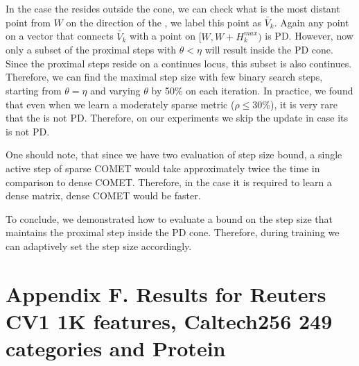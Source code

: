 \documentclass[twoside,11pt]{article}
\newcommand\mat[1]{{#1}}
\newcommand{\W}{\mat{W}}
\newcommand{\Hk}{H_k}
\newcommand{\Vk}{\mat{V_k}}
\begin{document}
In the case the \Vkorigin resides outside the cone, we can check what is the most distant point from $\W$ on the direction of the \Vkorigin, we label this point as $\widetilde{\Vk}$. Again any point on a vector that connects $\widetilde{\Vk}$ with a point on $[\W, \W + \Hk^{max})$ is PD. However, now only a subset of the proximal steps with $\theta < \eta$ will result inside the PD cone. Since the proximal steps reside on a continues locus, this subset is also continues. Therefore, we can find the maximal step size with few binary search steps, starting from $\theta = \eta$ and varying $\theta$ by 50\% on each iteration. In practice, we found that even when we learn a moderately sparse metric ($\rho \leq 30\%$), it is very rare that the \Vkorigin is not PD. Therefore, on our experiments we skip the update in case its \Vkorigin is not PD.

One should note, that since we have two evaluation of step size bound, a single active step of sparse COMET would take approximately twice the time in comparison to dense COMET. Therefore, in the case it is required to learn a dense matrix, dense COMET would be faster.

To conclude, we demonstrated how to evaluate a bound on the step size that maintains the proximal step inside the PD cone. Therefore, during training we can adaptively set the step size accordingly.

\section*{Appendix F. Results for Reuters CV1 1K features, Caltech256 249 categories and Protein}
\end{document}
